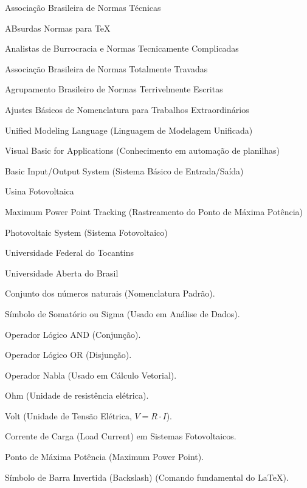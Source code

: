 \documentclass[
	12pt,				%
    oneside,            %
	a4paper,			%
	english,			%
	brazilian,		    %
	]{AcademicoUFT}
\begin{document}
\begin{siglas}
    \item[ABNT] Associação Brasileira de Normas Técnicas
    \item[abnTeX] ABsurdas Normas para TeX
    \item[ABNTC] Analistas de Burrocracia e Normas Tecnicamente Complicadas
    \item[ABNTT] Associação Brasileira de Normas Totalmente Travadas
    \item[ABNTE] Agrupamento Brasileiro de Normas Terrivelmente Escritas
    \item[ABNTX] Ajustes Básicos de Nomenclatura para Trabalhos Extraordinários
    \item[UML] Unified Modeling Language (Linguagem de Modelagem Unificada)
    \item[VBA] Visual Basic for Applications (Conhecimento em automação de planilhas)
    \item[BIOS] Basic Input/Output System (Sistema Básico de Entrada/Saída)
    \item[UFV] Usina Fotovoltaica
    \item[MPPT] Maximum Power Point Tracking (Rastreamento do Ponto de Máxima Potência)
    \item[PVS] Photovoltaic System (Sistema Fotovoltaico)
    \item[UFT] Universidade Federal do Tocantins
    \item[UAB] Universidade Aberta do Brasil
\end{siglas}


\begin{simbolos}
    \item[$ \mathbb{N} $] Conjunto dos números naturais (Nomenclatura Padrão).
    \item[$ \Sigma $] Símbolo de Somatório ou Sigma (Usado em Análise de Dados).
    \item[$ \land $] Operador Lógico AND (Conjunção).
    \item[$ \lor $] Operador Lógico OR (Disjunção).
    \item[$ \nabla $] Operador Nabla (Usado em Cálculo Vetorial).
    \item[$ \Omega $] Ohm (Unidade de resistência elétrica).
    \item[$ \text{V} $] Volt (Unidade de Tensão Elétrica, $V=R \cdot I$).
    \item[$ I_L $] Corrente de Carga (Load Current) em Sistemas Fotovoltaicos.
    \item[$ \text{P}_{\text{MPP}} $] Ponto de Máxima Potência (Maximum Power Point).
    \item[$ \texttt{\symbol{92}} $] Símbolo de Barra Invertida (Backslash) (Comando fundamental do \LaTeX).
\end{simbolos}
\end{document}
